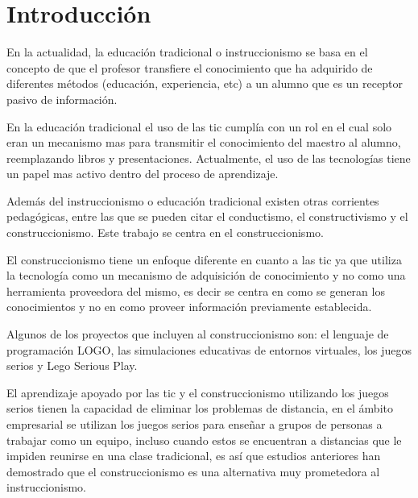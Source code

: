 \chapter{Introducción}


En la actualidad, la educación tradicional o instruccionismo se basa en el concepto de que el
profesor transfiere el conocimiento que ha adquirido de diferentes métodos
(educación, experiencia, etc) a un alumno que es un receptor pasivo de
información\cite{laptop:instructionism}. %

En la educación tradicional el uso de las \Gls{tic} cumplía con un rol en el 
cual solo eran un mecanismo mas para transmitir el conocimiento del maestro al alumno,
reemplazando libros y presentaciones. Actualmente, el uso de las tecnologías tiene un
papel mas activo dentro del proceso de aprendizaje.

Además del instruccionismo o educación tradicional existen otras corrientes pedagógicas, 
entre las que se pueden citar el conductismo, el constructivismo y el construccionismo. Este
trabajo se centra en el construccionismo.

El construccionismo tiene un enfoque diferente en cuanto a las \Gls{tic} ya que
utiliza la tecnología como un mecanismo de adquisición de conocimiento y no como
una herramienta proveedora del mismo\cite{sasha:construtivism}, es decir se
centra en como se generan los conocimientos y no en como proveer información
previamente establecida. 

Algunos de los proyectos que incluyen al construccionismo son: 
el lenguaje de programación LOGO, las simulaciones educativas de entornos virtuales, 
los juegos serios y Lego Serious Play.

El aprendizaje apoyado por las \Gls{tic} y el construccionismo utilizando los
juegos serios tienen la capacidad de eliminar los problemas de distancia, en el
ámbito empresarial se utilizan los juegos serios para enseñar a grupos de
personas a trabajar como un equipo, incluso cuando estos se encuentran a
distancias que le impiden reunirse en una clase tradicional\cite{mariluz:seiousgames}, 
es así que estudios anteriores han demostrado que el construccionismo es una alternativa 
muy prometedora al instruccionismo\cite{sasha:construtivism}.
   
